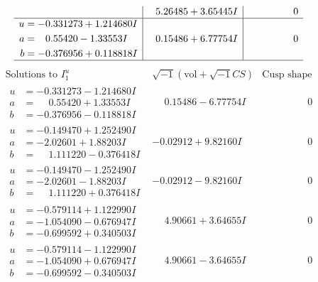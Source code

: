 \documentclass[1p]{elsarticle_modified}
\theoremstyle{definition}
\newcommand{\I}{\sqrt{-1}}
\begin{document}
$$\begin{array}{c|c|c}
 & \phantom{-}5.26485 + 3.65445 I & \phantom{-0.000000 } 0 \\ \hline\begin{aligned}
u &= -0.331273 + 1.214680 I \\
a &= \phantom{-}0.55420 - 1.33553 I \\
b &= -0.376956 + 0.118818 I\end{aligned}
 & \phantom{-}0.15486 + 6.77754 I & \phantom{-0.000000 } 0\\
 \hline 
 \end{array}$$\newpage$$\begin{array}{c|c|c}  
\text{Solutions to }I^u_{1}& \I (\text{vol} + \sqrt{-1}CS) & \text{Cusp shape}\\
 \hline 
\begin{aligned}
u &= -0.331273 - 1.214680 I \\
a &= \phantom{-}0.55420 + 1.33553 I \\
b &= -0.376956 - 0.118818 I\end{aligned}
 & \phantom{-}0.15486 - 6.77754 I & \phantom{-0.000000 } 0 \\ \hline\begin{aligned}
u &= -0.149470 + 1.252490 I \\
a &= -2.02601 + 1.88203 I \\
b &= \phantom{-}1.111220 - 0.376418 I\end{aligned}
 & -0.02912 + 9.82160 I & \phantom{-0.000000 } 0 \\ \hline\begin{aligned}
u &= -0.149470 - 1.252490 I \\
a &= -2.02601 - 1.88203 I \\
b &= \phantom{-}1.111220 + 0.376418 I\end{aligned}
 & -0.02912 - 9.82160 I & \phantom{-0.000000 } 0 \\ \hline\begin{aligned}
u &= -0.579114 + 1.122990 I \\
a &= -1.054090 - 0.676947 I \\
b &= -0.699592 + 0.340503 I\end{aligned}
 & \phantom{-}4.90661 + 3.64655 I & \phantom{-0.000000 } 0 \\ \hline\begin{aligned}
u &= -0.579114 - 1.122990 I \\
a &= -1.054090 + 0.676947 I \\
b &= -0.699592 - 0.340503 I\end{aligned}
 & \phantom{-}4.90661 - 3.64655 I & \phantom{-0.000000 } 0 \\ \hline\begin{aligned}

\end{aligned}
\end{array}$$
\end{document}
